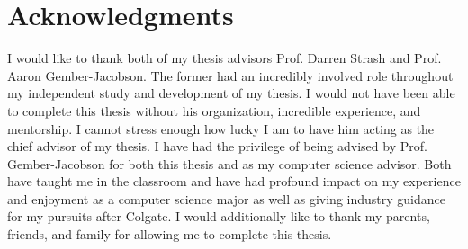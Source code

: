 \documentclass[../thesis.tex]{subfiles}
\begin{document}
\chapter*{Acknowledgments}

I would like to thank both of my thesis advisors Prof. Darren Strash and Prof. Aaron Gember-Jacobson. The former had an incredibly involved role throughout my independent study and development of my thesis. I would not have been able to complete this thesis without his organization, incredible experience, and mentorship. I cannot stress enough how lucky I am to have him acting as the chief advisor of my thesis. I have had the privilege of being advised by Prof. Gember-Jacobson for both this thesis and as my computer science advisor. Both have taught me in the classroom and have had profound impact on my experience and enjoyment as a computer science major as well as giving industry guidance for my pursuits after Colgate. I would additionally like to thank my parents, friends, and family for allowing me to complete this thesis. 

\cleardoublepage
\end{document}
